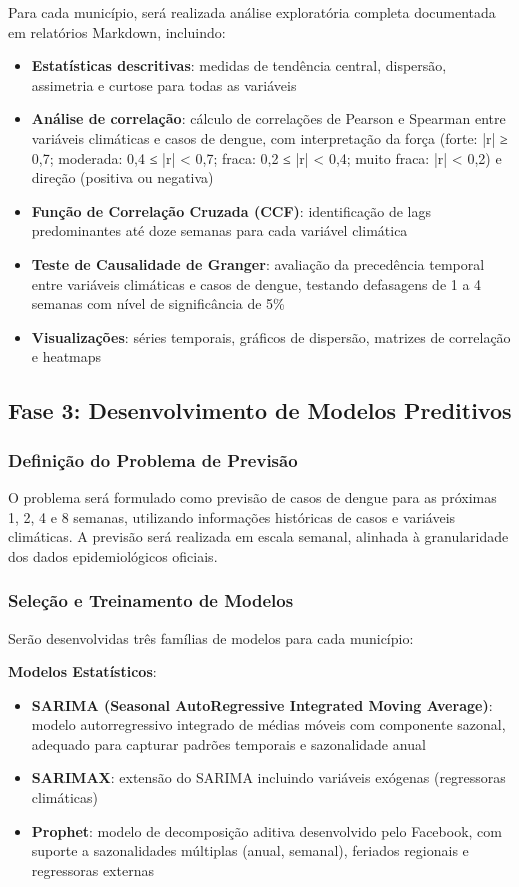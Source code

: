 Para cada município, será realizada análise exploratória completa documentada em relatórios Markdown, incluindo:

\begin{itemize}
    \item \textbf{Estatísticas descritivas}: medidas de tendência central, dispersão, assimetria e curtose para todas as variáveis
    \item \textbf{Análise de correlação}: cálculo de correlações de Pearson e Spearman entre variáveis climáticas e casos de dengue, com interpretação da força (forte: |r| ≥ 0,7; moderada: 0,4 ≤ |r| < 0,7; fraca: 0,2 ≤ |r| < 0,4; muito fraca: |r| < 0,2) e direção (positiva ou negativa)
    \item \textbf{Função de Correlação Cruzada (CCF)}: identificação de lags predominantes até doze semanas para cada variável climática
    \item \textbf{Teste de Causalidade de Granger}: avaliação da precedência temporal entre variáveis climáticas e casos de dengue, testando defasagens de 1 a 4 semanas com nível de significância de 5\%
    \item \textbf{Visualizações}: séries temporais, gráficos de dispersão, matrizes de correlação e heatmaps
\end{itemize}

\subsection{Fase 3: Desenvolvimento de Modelos Preditivos}

\subsubsection{Definição do Problema de Previsão}

O problema será formulado como previsão de casos de dengue para as próximas 1, 2, 4 e 8 semanas, utilizando informações históricas de casos e variáveis climáticas. A previsão será realizada em escala semanal, alinhada à granularidade dos dados epidemiológicos oficiais.

\subsubsection{Seleção e Treinamento de Modelos}

Serão desenvolvidas três famílias de modelos para cada município:

\textbf{Modelos Estatísticos}:
\begin{itemize}
    \item \textbf{SARIMA (Seasonal AutoRegressive Integrated Moving Average)}: modelo autorregressivo integrado de médias móveis com componente sazonal, adequado para capturar padrões temporais e sazonalidade anual
    \item \textbf{SARIMAX}: extensão do SARIMA incluindo variáveis exógenas (regressoras climáticas)
    \item \textbf{Prophet}: modelo de decomposição aditiva desenvolvido pelo Facebook, com suporte a sazonalidades múltiplas (anual, semanal), feriados regionais e regressoras externas
\end{itemize}

